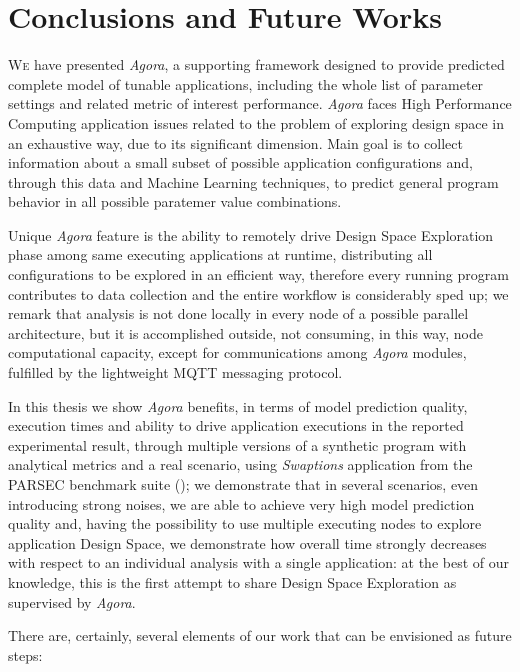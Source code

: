 \chapter{Conclusions and Future Works}\label{end}

\lettrine{W}{e} have presented \textit{Agora}, a supporting framework designed to provide predicted complete model of tunable applications, including the whole list of parameter settings and related metric of interest performance. \textit{Agora} faces High Performance Computing application issues related to the problem of exploring design space in an exhaustive way, due to its significant dimension. Main goal is to collect information about a small subset of possible application configurations and, through this data and Machine Learning techniques, to predict general program behavior in all possible paratemer value combinations.

Unique \textit{Agora} feature is the ability to remotely drive Design Space Exploration phase among same executing applications at runtime, distributing all configurations to be explored in an efficient way, therefore every running program contributes to data collection and the entire workflow is considerably sped up; we remark that analysis is not done locally in every node of a possible parallel architecture, but it is accomplished outside, not consuming, in this way, node computational capacity, except for communications among \textit{Agora} modules, fulfilled by the lightweight MQTT messaging protocol.

In this thesis we show \textit{Agora} benefits, in terms of model prediction quality, execution times and ability to drive application executions in the reported experimental result, through multiple versions of a synthetic program with analytical metrics and a real scenario, using \textit{Swaptions} application from the PARSEC benchmark suite (\cite{bienia2008parsec}); we demonstrate that in several scenarios, even introducing strong noises, we are able to achieve very high model prediction quality and, having the possibility to use multiple executing nodes to explore application Design Space, we demonstrate how overall time strongly decreases with respect to an individual analysis with a single application: at the best of our knowledge, this is the first attempt to share Design Space Exploration as supervised by \textit{Agora}.

There are, certainly, several elements of our work that can be envisioned as future steps:

